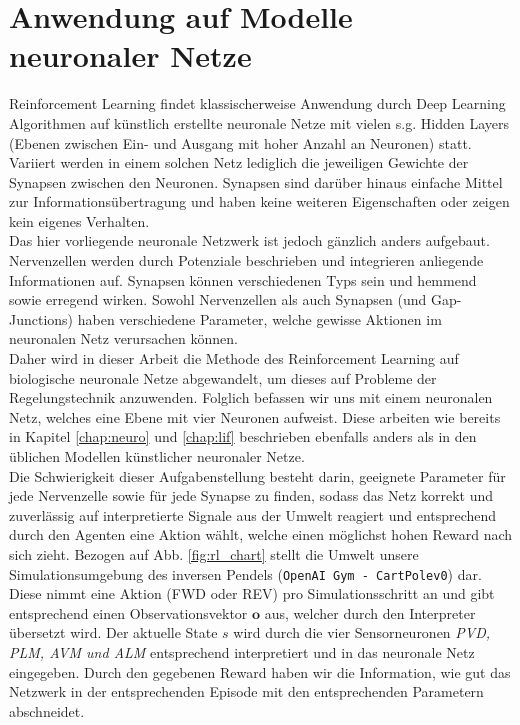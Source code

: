 \section{Anwendung auf Modelle neuronaler Netze}
\label{sec:rl_neuro}
	Reinforcement Learning findet klassischerweise Anwendung durch Deep Learning Algorithmen auf künstlich erstellte neuronale Netze mit vielen s.g. \grqq Hidden Layers\glqq{} (Ebenen zwischen Ein- und Ausgang mit hoher Anzahl an Neuronen) statt. Variiert werden in einem solchen Netz lediglich die jeweiligen Gewichte der Synapsen zwischen den Neuronen. Synapsen sind darüber hinaus einfache Mittel zur Informationsübertragung und haben keine weiteren Eigenschaften oder zeigen kein eigenes Verhalten.\\
	Das hier vorliegende neuronale Netzwerk ist jedoch gänzlich anders aufgebaut. Nervenzellen werden durch Potenziale beschrieben und integrieren anliegende Informationen auf. Synapsen können verschiedenen Typs sein und hemmend sowie erregend wirken. Sowohl Nervenzellen als auch Synapsen (und Gap-Junctions) haben verschiedene Parameter, welche gewisse Aktionen im neuronalen Netz verursachen können.\\
	Daher wird in dieser Arbeit die Methode des Reinforcement Learning auf biologische neuronale Netze abgewandelt, um dieses auf Probleme der Regelungstechnik anzuwenden. Folglich befassen wir uns mit einem neuronalen Netz, welches eine Ebene mit vier Neuronen aufweist. Diese  arbeiten wie bereits in Kapitel \ref{chap:neuro} und \ref{chap:lif} beschrieben ebenfalls anders als in den üblichen Modellen künstlicher neuronaler Netze.\\
	Die Schwierigkeit dieser Aufgabenstellung besteht darin, geeignete Parameter für jede Nervenzelle sowie für jede Synapse zu finden, sodass das Netz korrekt und zuverlässig auf interpretierte Signale aus der Umwelt reagiert und entsprechend durch den Agenten eine Aktion wählt, welche einen möglichst hohen Reward nach sich zieht. Bezogen auf Abb. \ref{fig:rl_chart} stellt die Umwelt unsere Simulationsumgebung des inversen Pendels (\texttt{OpenAI Gym - CartPolev0}) dar. Diese nimmt eine Aktion (FWD oder REV) pro Simulationsschritt an und gibt entsprechend einen Observationsvektor $\textbf{o}$ aus, welcher durch den Interpreter übersetzt wird. Der aktuelle State $s$ wird durch die vier Sensorneuronen \textit{PVD, PLM, AVM und ALM} entsprechend interpretiert und in das neuronale Netz eingegeben. Durch den gegebenen Reward haben wir die Information, wie gut das Netzwerk in der entsprechenden Episode mit den entsprechenden Parametern abschneidet.

